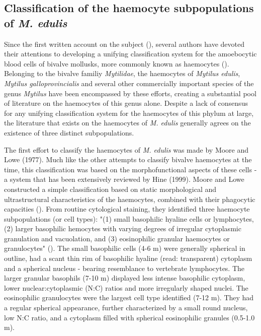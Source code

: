 \subsection{Classification of the haemocyte subpopulations of \emph{M. edulis}}
\label{subsection:haemocyte_classification}
Since the first written account on the subject (\cite{Cuenot1891}), several authors have devoted their attentions to developing a unifying classification system for the amoebocytic blood cells of bivalve mollusks, more commonly known as haemocytes (\cite{Cheng1980, delaBallina2022}). Belonging to the bivalve familiy \emph{Mytilidae}, the haemocytes of \emph{Mytilus edulis}, \emph{Mytilus galloprovincialis} and several other commercially important species of the genus \emph{Mytilus} have been encompassed by these efforts, creating a substantial pool of literature on the haemocytes of this genus alone. Despite a lack of consensus for any unifying classification system for the haemocytes of this phylum at large, the literature that exists on the haemocytes of \emph{M. edulis} generally agrees on the existence of three distinct subpopulations.

The first effort to classify the haemocytes of \emph{M. edulis} was made by Moore and Lowe (1977). Much like the other attempts to classify bivalve haemocytes at the time, this classification was based on the morphofunctional aspects of these cells - a system that has been extensively reviewed by Hine (1999). Moore and Lowe constructed a simple classification based on static morphological and ultrastructural characteristics of the haemocytes, combined with their phagocytic capacities (\cite{Moore1977}). From routine cytological staining, they identified three haemocyte subpopulations (or cell types): "(1) small basophilic hyaline cells or lymphocytes, (2) larger basophilic hemocytes with varying degrees of irregular cytoplasmic granulation and vacuolation, and (3) eosinophilic granular haemocytes or granulocytes" (\cite{Moore1977}). The small basophilic cells (4-6 \micro m) were generally spherical in outline, had a scant thin rim of basophilic hyaline (read: transparent) cytoplasm and a spherical nucleus - bearing resemblance to vertebrate lymphocytes. The larger granular basophils (7-10 \micro m) displayed less intense basophilic cytoplasm, lower nuclear:cytoplasmic (N:C) ratios and more irregularly shaped nuclei. The eosinophilic granulocytes were the largest cell type identified (7-12 \micro m). They had a regular spherical appearance, further characterized by a small round nucleus, low N:C ratio, and a cytoplasm filled with spherical eosinophilic granules (0.5-1.0 \micro m).


